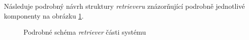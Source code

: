 Následuje podrobný návrh struktury \emph{retrieveru} znázorňující podrobně jednotlivé komponenty na obrázku \ref{retriever-podrobne}.

\begin{figure}[hbt]
    \centering
	\caption{Podrobné schéma \emph{retriever} části systému}
	\label{retriever-podrobne}
\end{figure}

